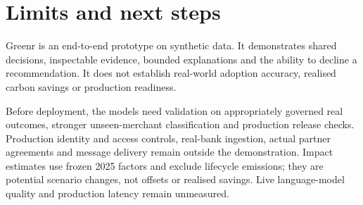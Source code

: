 \documentclass[10pt,a4paper]{article}
\begin{document}
\section{Limits and next steps}
Greenr is an end-to-end prototype on synthetic data. It demonstrates shared decisions, inspectable evidence, bounded explanations and the ability to decline a recommendation. It does not establish real-world adoption accuracy, realised carbon savings or production readiness.

Before deployment, the models need validation on appropriately governed real outcomes, stronger unseen-merchant classification and production release checks. Production identity and access controls, real-bank ingestion, actual partner agreements and message delivery remain outside the demonstration. Impact estimates use frozen 2025 factors and exclude lifecycle emissions; they are potential scenario changes, not offsets or realised savings. Live language-model quality and production latency remain unmeasured.
\end{document}
